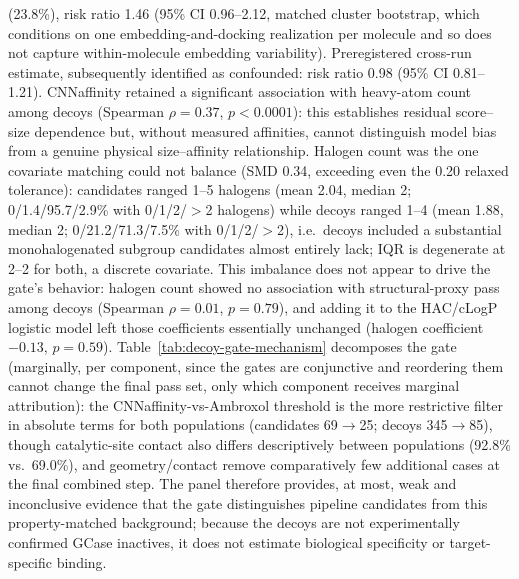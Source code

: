 \documentclass{article}
\begin{document}
(23.8\%), risk ratio 1.46 (95\% CI 0.96--2.12, matched cluster bootstrap, which conditions on one embedding-and-docking realization per molecule and so does not capture within-molecule embedding variability). Preregistered cross-run estimate, subsequently identified as confounded: risk ratio 0.98 (95\% CI 0.81--1.21). CNNaffinity retained a significant association with heavy-atom count among decoys (Spearman $\rho=0.37$, $p<0.0001$): this establishes residual score--size dependence but, without measured affinities, cannot distinguish model bias from a genuine physical size--affinity relationship. Halogen count was the one covariate matching could not balance (SMD 0.34, exceeding even the 0.20 relaxed tolerance): candidates ranged 1--5 halogens (mean 2.04, median 2; 0/1.4/95.7/2.9\% with 0/1/2/$>$2 halogens) while decoys ranged 1--4 (mean 1.88, median 2; 0/21.2/71.3/7.5\% with 0/1/2/$>$2), i.e.\ decoys included a substantial monohalogenated subgroup candidates almost entirely lack; IQR is degenerate at 2--2 for both, a discrete covariate. This imbalance does not appear to drive the gate's behavior: halogen count showed no association with structural-proxy pass among decoys (Spearman $\rho=0.01$, $p=0.79$), and adding it to the HAC/cLogP logistic model left those coefficients essentially unchanged (halogen coefficient $-0.13$, $p=0.59$). Table~\ref{tab:decoy-gate-mechanism} decomposes the gate (marginally, per component, since the gates are conjunctive and reordering them cannot change the final pass set, only which component receives marginal attribution): the CNNaffinity-vs-Ambroxol threshold is the more restrictive filter in absolute terms for both populations (candidates 69$\to$25; decoys 345$\to$85), though catalytic-site contact also differs descriptively between populations (92.8\% vs.\ 69.0\%), and geometry/contact remove comparatively few additional cases at the final combined step. The panel therefore provides, at most, weak and inconclusive evidence that the gate distinguishes pipeline candidates from this property-matched background; because the decoys are not experimentally confirmed GCase inactives, it does not estimate biological specificity or target-specific binding.
\end{document}
